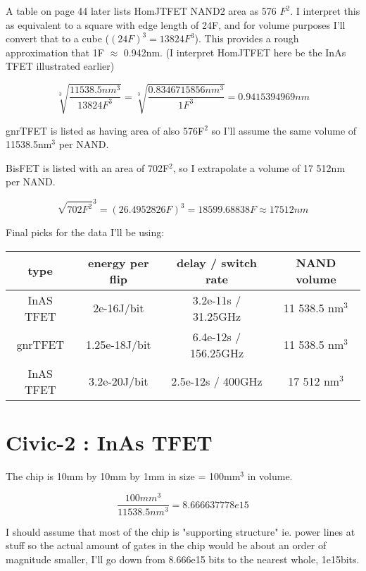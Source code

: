 \documentclass[a4paper]{article}
\begin{document}
	\medskip
	
	A table on page 44 later lists HomJTFET NAND2 area as 576 $F^2$. I interpret this as equivalent to a square with edge length of 24F, and for volume purposes I'll convert that to a cube ($(24F)^3 = 13824F^3$). This provides a rough approximation that 1F $\approx$ 0.942nm. (I interpret HomJTFET here be the InAs TFET illustrated earlier)
	
	$$ \sqrt[3]{\frac{11 538.5nm^3}{13824F^3}} = \sqrt[3]{\frac{0.8346715856 nm^3}{1F^3}} = 0.9415394969 nm$$
	
	gnrTFET is listed as having area of also 576F$^2$ so I'll assume the same volume of 11538.5nm$^3$ per NAND.
	
	\medskip
	
	BisFET is listed with an area of 702F$^2$, so I extrapolate a volume of 17 512nm per NAND.
	
	$$ \sqrt{702F^2}^3 = (26.4952826F)^3 = 18599.68838F \approx 17 512nm $$
	
	\bigskip
	
	Final picks for the data I'll be using:
	
	\begin{center}
		\begin{tabular}{| c | c | c | c |}
			\hline
			type & energy per flip & delay / switch rate & NAND volume \\\hline
			InAS TFET & 2e-16J/bit & 3.2e-11s / 31.25GHz & 11 538.5 nm$^3$ \\\hline
			gnrTFET & 1.25e-18J/bit & 6.4e-12s / 156.25GHz & 11 538.5 nm$^3$ \\\hline
			InAS TFET & 3.2e-20J/bit & 2.5e-12s / 400GHz & 17 512 nm$^3$ \\\hline
		\end{tabular}
	\end{center}
	
	\pagebreak
	
	\section{Civic-2 : InAs TFET}
	
	The chip is 10mm by 10mm by 1mm in size = 100mm$^3$ in volume.
	
	$$ \frac{100mm^3}{11538.5nm^3} = 8.666637778e15 $$
	
	I should assume that most of the chip is "supporting structure" ie. power lines at stuff so the actual amount of gates in the chip would be about an order of magnitude smaller, I'll go down from 8.666e15 bits to the nearest whole, 1e15bits.
	
\end{document}
